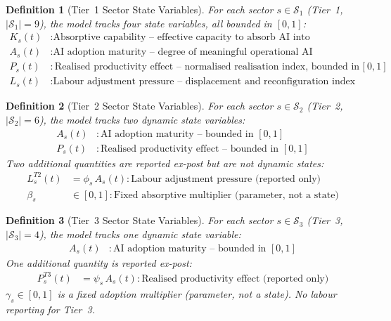 \documentclass[11pt,a4paper]{article}
\newtheorem{definition}{Definition}
\begin{document}
\begin{definition}[Tier~1 Sector State Variables]
For each sector $s \in \mathcal{S}_1$ (Tier~1, $|\mathcal{S}_1| = 9$), the model tracks four state variables, all bounded in $[0,1]$:
\begin{align}
K_s(t) &: \text{Absorptive capability -- effective capacity to absorb AI into productive use} \\
A_s(t) &: \text{AI adoption maturity -- degree of meaningful operational AI deployment} \\
P_s(t) &: \text{Realised productivity effect -- normalised realisation index, bounded in $[0,1]$} \\
L_s(t) &: \text{Labour adjustment pressure -- displacement and reconfiguration index}
\end{align}
\end{definition}

\begin{definition}[Tier~2 Sector State Variables]
For each sector $s \in \mathcal{S}_2$ (Tier~2, $|\mathcal{S}_2| = 6$), the model tracks two dynamic state variables:
\begin{align}
A_s(t) &: \text{AI adoption maturity -- bounded in $[0,1]$} \\
P_s(t) &: \text{Realised productivity effect -- bounded in $[0,1]$}
\end{align}
Two additional quantities are reported ex-post but are not dynamic states:
\begin{align}
L_s^{T2}(t) &= \phi_s\, A_s(t) : \text{Labour adjustment pressure (reported only)} \\
\beta_s &\in [0,1] : \text{Fixed absorptive multiplier (parameter, not a state)}
\end{align}
\end{definition}

\begin{definition}[Tier~3 Sector State Variables]
For each sector $s \in \mathcal{S}_3$ (Tier~3, $|\mathcal{S}_3| = 4$), the model tracks one dynamic state variable:
\begin{align}
A_s(t) &: \text{AI adoption maturity -- bounded in $[0,1]$}
\end{align}
One additional quantity is reported ex-post:
\begin{align}
P_s^{T3}(t) &= \psi_s\, A_s(t) : \text{Realised productivity effect (reported only)}
\end{align}
$\gamma_s \in [0,1]$ is a fixed adoption multiplier (parameter, not a state). No labour reporting for Tier~3.
\end{definition}
\end{document}
